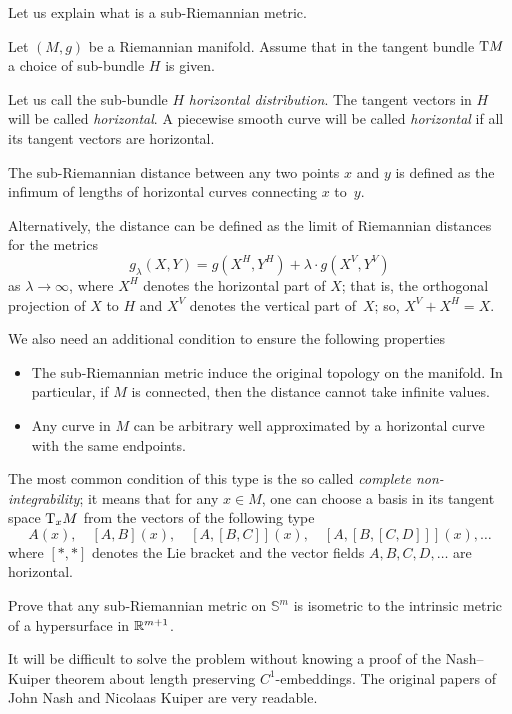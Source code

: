 Let us explain what is a sub-Riemannian metric.

Let $(M,g)$ be a Riemannian manifold.
Assume that in the tangent bundle $\mathrm{T} M$ 
a choice of sub-bundle $H$ is given.

Let us call the sub-bundle $H$  \emph{horizontal distribution}.
The tangent vectors in $H$ will be called {}\emph{horizontal}.
A piecewise smooth curve will be called {}\emph{horizontal}
if all its tangent vectors are horizontal.

The sub-Riemannian distance between any two points $x$ and $y$ is defined as the infimum of lengths of horizontal curves connecting $x$ to~$y$.

Alternatively, the distance can be defined as the limit of Riemannian distances 
for the metrics 
\[g_\lambda(X,Y)=g(X^H,Y^H)+\lambda\cdot g(X^V,Y^V)\] 
as $\lambda\to \infty$,
where $X^H$ denotes the horizontal part of $X$;
that is, the orthogonal projection of $X$ to $H$
and $X^V$ denotes the vertical part of~$X$;
so, $X^V+X^H=X$.

We also need an additional condition to ensure the following properties 
\begin{itemize}
\item The sub-Riemannian metric induce the original topology on the manifold. 
In particular, if $M$ is connected, then the distance cannot take infinite values.
\item Any curve in $M$ can be arbitrary well approximated by a horizontal curve with the same endpoints.
\end{itemize}
The most common condition of this type is the so called {}\emph{complete non-integrability};
it means that for any $x\in M$, 
one can choose a basis in its tangent space $\mathrm{T}_xM$
from the vectors of the following type
\[A(x),\quad  [A,B](x),\quad [A,[B,C]](x),\quad [A,[B,[C,D]]](x),\dots\] 
where $[{*},{*}]$ denotes the Lie bracket 
and the vector fields $A,B,C,D, \dots$ are horizontal.

\begin{pr}
Prove that any sub-Riemannian metric 
on $\mathbb{S}^m$ is isometric to the intrinsic metric of a hypersurface in $\mathbb{R}^{m+1}$.
\end{pr}


It will be difficult to solve the problem without knowing a proof of the Nash--Kuiper theorem about length preserving $C^1$-embeddings.
The original papers of John Nash 
and Nicolaas Kuiper \cite{nash,kuiper} are very readable.

